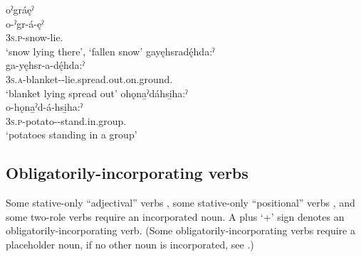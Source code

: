 \ea\label{ex:incverbex4}
\ea oˀgráęˀ \\
\gll o-ˀgr-á-ęˀ\\
 \textsc{3s.p}-snow-lie.{\stative}\\
\glt ‘snow lying there’, `fallen snow'
\ex gayęhsradę́hda:ˀ\\
\gll ga-yęhsr-a-dę́hda:ˀ\\
 \textsc{3s.a}-blanket-{\joinerA}-lie.spread.out.on.ground.{\stative}\\
\glt `blanket lying spread out'
\ex ohǫna̱ˀdáhsi̱ha:ˀ\\
\gll o-hǫna̱ˀd-á-hsi̱ha:ˀ\\
 \textsc{3s.p}-potato-{\joinerA}-stand.in.group.{\stative}\\
\glt `potatoes standing in a group'
\z
\z


\subsection{Obligatorily-incorporating verbs} \label{ch:Obligatorily incorporating verbs}
Some stative-only “adjectival” verbs , some stative-only “positional” verbs , and some two-role verbs  require an incorporated noun. A plus ‘+’ sign denotes an obligatorily-incorporating verb. (Some obligatorily-incorporating verbs require a placeholder noun, if no other noun is incorporated, see .)

